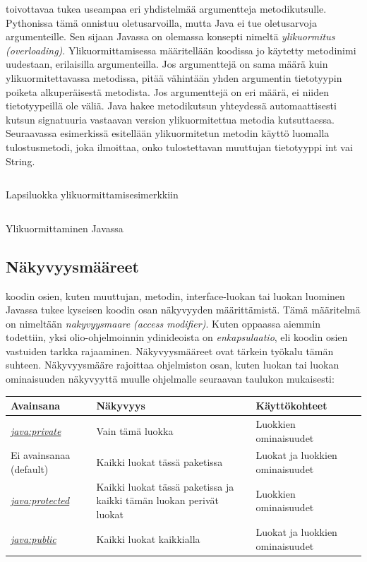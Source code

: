 \documentclass{tufte-book}
\newcommand{\eng}[1]{\textit{(#1)}}
\newcommand{\new}[1]{\textit{\gls{#1}}}
\newcommand{\neweng}[2]{\new{#1} \eng{#2}}
\newcommand{\java}[1]{\underline{\gls{java:#1}}}
\newcommand{\newjava}[1]{\textit{\java{#1}}}
\newcommand{\code}[3]{
\begin{listing}
    \inputminted{java}{OhjelmointiopasEsimerkit/src/#1/#2.java}
    \caption{#3}
    \label{Java-#1-#2}
\end{listing}
}
\begin{document}
 toivottavaa tukea useampaa eri yhdistelmää argumentteja metodikutsulle.
Pythonissa tämä onnistuu oletusarvoilla, mutta Java ei tue oletusarvoja argumenteille. Sen
sijaan Javassa on olemassa konsepti nimeltä \neweng{ylikuormitus}{overloading}.
Ylikuormittamisessa määritellään koodissa jo käytetty metodinimi uudestaan, erilaisilla
argumenteilla. Jos argumenttejä on sama määrä kuin ylikuormitettavassa metodissa, pitää vähintään
yhden argumentin tietotyypin poiketa alkuperäisestä metodista. Jos argumenttejä on eri määrä, ei
niiden tietotyypeillä ole väliä. Java hakee metodikutsun yhteydessä automaattisesti kutsun
signatuuria vastaavan version ylikuormitettua metodia kutsuttaessa. Seuraavassa esimerkissä
esitellään ylikuormitetun metodin käyttö luomalla tulostusmetodi, joka ilmoittaa, onko
tulostettavan muuttujan tietotyyppi int vai String.

\code{week2/overloadingexample}{OverloadedPrinter}{Lapsiluokka ylikuormittamisesimerkkiin}
\code{week2/overloadingexample}{Main}{Ylikuormittaminen Javassa}

\subsection{Näkyvyysmääreet}
\label{näkyvyysmääreet}

 koodin osien, kuten muuttujan, metodin, interface-luokan tai luokan
luominen Javassa tukee kyseisen koodin osan näkyvyyden määrittämistä. Tämä määritelmä on nimeltään 
\neweng{nakyvyysmaare}{access modifier}. Kuten oppaassa aiemmin todettiin, yksi olio-ohjelmoinnin
ydinideoista on \new{enkapsulaatio}, eli koodin osien vastuiden tarkka rajaaminen. Näkyvyysmääreet
ovat tärkein työkalu tämän suhteen. Näkyvyysmääre rajoittaa ohjelmiston osan, kuten luokan tai
luokan ominaisuuden näkyvyyttä muulle ohjelmalle seuraavan taulukon mukaisesti:

\bigskip
\begin{center}
\footnotesize
\begin{tabular}{lll}
\toprule
Avainsana & Näkyvyys & Käyttökohteet \\
\midrule
\newjava{private} & Vain tämä luokka & Luokkien ominaisuudet \\
\addlinespace
Ei avainsanaa (default) & Kaikki luokat tässä paketissa & Luokat ja luokkien ominaisuudet \\
\addlinespace
\newjava{protected} & Kaikki luokat tässä paketissa ja kaikki tämän luokan perivät luokat &
Luokkien ominaisuudet \\
\addlinespace
\newjava{public} & Kaikki luokat kaikkialla & Luokat ja luokkien ominaisuudet \\
\bottomrule
\end{tabular}
\end{center}
\end{document}
